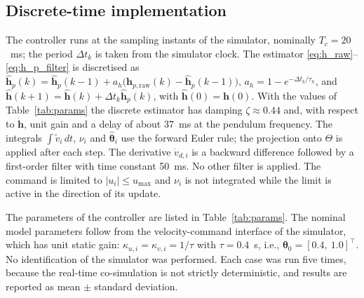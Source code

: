 \subsection{Discrete-time implementation}\label{sec:discrete}
The controller runs at the sampling instants of the simulator, nominally $T_c=20$~ms; the period
$\Delta t_k$ is taken from the simulator clock. The estimator
\eqref{eq:h_raw}--\eqref{eq:h_p_filter} is discretised as
$\hat{\mathbf{h}}_p(k)=\hat{\mathbf{h}}_p(k-1)+a_h\big(\mathbf{h}_{p,\mathrm{raw}}(k)-\hat{\mathbf{h}}_p(k-1)\big)$,
$a_h=1-e^{-\Delta t_k/\tau_h}$, and
$\hat{\mathbf{h}}(k+1)=\hat{\mathbf{h}}(k)+\Delta t_k\hat{\mathbf{h}}_p(k)$, with $\hat{\mathbf{h}}(0)=\mathbf{h}(0)$.
With the values of Table~\ref{tab:params} the discrete estimator has damping $\zeta\approx0.44$ and,
with respect to $\dot{\mathbf{h}}$, unit gain and a delay of about 37~ms at the pendulum frequency.
The integrals $\int\tilde v_i\,dt$, $\nu_i$ and $\hat{\boldsymbol{\theta}}_i$ use the forward Euler rule;
the projection onto $\Theta$ is applied after each step. The derivative $\dot v_{d,i}$ is a backward
difference followed by a first-order filter with time constant 50~ms. No other filter is applied.
The command is limited to $|u_i|\le u_{\max}$ and $\nu_i$ is not integrated while the limit is active
in the direction of its update.

The parameters of the controller are listed in Table~\ref{tab:params}. The nominal model parameters
follow from the velocity-command interface of the simulator, which has unit static gain:
$\kappa_{u,i}=\kappa_{v,i}=1/\tau$ with $\tau=0.4$~s, i.e., $\boldsymbol{\theta}_0=[0.4,\ 1.0]^{\top}$.
No identification of the simulator was performed. Each case was run five times, because the real-time
co-simulation is not strictly deterministic, and results are reported as mean $\pm$ standard deviation.

